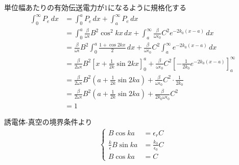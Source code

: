 \documentclass[a4paper,10pt]{bxjsarticle}
\begin{document}
単位幅あたりの有効伝送電力が$1$になるように規格化する
\begin{align*}
    \int_0^\infty P_e \,dx 
    &= \int_0^a P_e \,dx + \int_a^\infty P_e \,dx\\
    &= \int_0^a \frac{\beta}{\omega \epsilon} B^2 \cos^2 kx  \,dx 
     + \int_a^\infty \frac{\beta}{\omega \epsilon_0} C^2 e^{-2k_0(x-a)} \,dx\\
    &= \frac{\beta}{\omega \epsilon} B^2 \int_0^a \frac{1+\cos 2kx}{2}  \,dx 
     + \frac{\beta}{\omega \epsilon_0} C^2 \int_a^\infty  e^{-2k_0(x-a)} \,dx\\
    &= \frac{\beta}{2\omega \epsilon} B^2 \left[ x + \frac{1}{2k} \sin 2kx \right]_0^a 
     + \frac{\beta}{\omega \epsilon_0} C^2 \left[ -\frac{1}{2k_0} e^{-2k_0(x-a)} \right]_a^\infty \\
    &= \frac{\beta}{2\omega \epsilon} B^2 \left( a + \frac{1}{2k} \sin 2ka \right)
     + \frac{\beta}{\omega \epsilon_0} C^2 \cdot \frac{1}{2k_0} \\
    &= \frac{\beta}{2\omega \epsilon} B^2 \left( a + \frac{1}{2k} \sin 2ka \right) + \frac{\beta}{2k_0 \omega \epsilon_0} C^2 \\
    &= 1
\end{align*}

誘電体-真空の境界条件より
\begin{align*}
    \begin{cases}
        B \cos ka &= \epsilon_r C \\
        \frac{k}{\epsilon} B \sin ka &= \frac{k_0}{\epsilon_0} C \\
        B \cos ka &= C
    \end{cases}
\end{align*}
\end{document}
